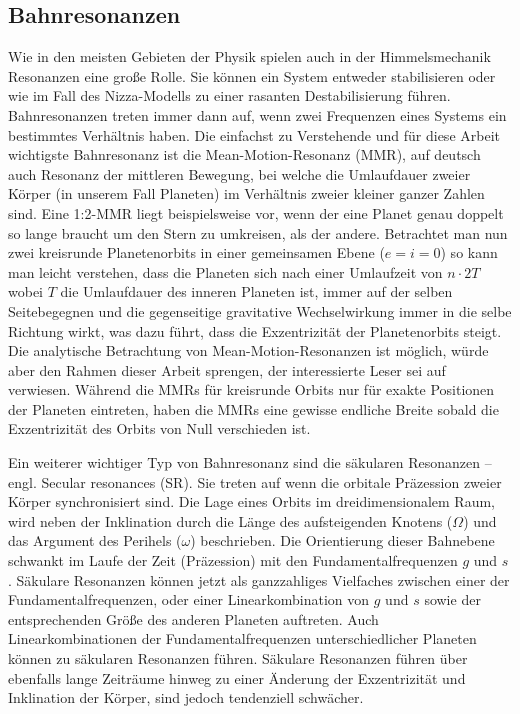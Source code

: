 \documentclass[12pt,a4paper,twoside]{article}
\begin{document}
\subsection{Bahnresonanzen}
Wie in den meisten Gebieten der Physik spielen auch in der Himmelsmechanik Resonanzen eine große Rolle. Sie können ein System entweder stabilisieren oder wie im Fall des Nizza-Modells zu einer rasanten Destabilisierung führen.
Bahnresonanzen treten immer dann auf, wenn zwei Frequenzen eines Systems ein bestimmtes Verhältnis haben.
Die einfachst zu Verstehende und für diese Arbeit wichtigste Bahnresonanz ist die Mean-Motion-Resonanz (MMR), auf deutsch auch Resonanz der mittleren Bewegung, bei welche die Umlaufdauer zweier Körper (in unserem Fall Planeten) im Verhältnis zweier kleiner ganzer Zahlen sind.
Eine 1:2-MMR liegt beispielsweise vor, wenn der eine Planet genau doppelt so lange braucht um den Stern zu umkreisen, als der andere. Betrachtet man nun zwei kreisrunde Planetenorbits in einer gemeinsamen Ebene ($e=i=0$) so kann man leicht verstehen, dass die Planeten sich nach einer Umlaufzeit von $n\cdot 2T$ wobei $T$ die Umlaufdauer des inneren Planeten ist, immer auf der \glqq selben Seite\grqq begegnen und die gegenseitige gravitative Wechselwirkung immer in die selbe Richtung wirkt, was dazu führt, dass die Exzentrizität der Planetenorbits steigt.
Die analytische Betrachtung von Mean-Motion-Resonanzen ist möglich, würde aber den Rahmen dieser Arbeit sprengen, der interessierte Leser sei auf \cite{Dvorak2005} verwiesen. %
Während die MMRs für kreisrunde Orbits nur für exakte Positionen der Planeten eintreten, haben die MMRs eine gewisse endliche Breite sobald die Exzentrizität des Orbits von Null verschieden ist.

Ein weiterer wichtiger Typ von Bahnresonanz sind die säkularen Resonanzen – engl. Secular resonances (SR). Sie treten auf wenn die orbitale Präzession zweier Körper synchronisiert sind. %
Die Lage eines Orbits im dreidimensionalem Raum, wird neben der Inklination durch die Länge des aufsteigenden Knotens ($\Omega$) und das Argument des Perihels ($\omega$) beschrieben. Die Orientierung dieser Bahnebene schwankt im Laufe der Zeit (Präzession) mit den Fundamentalfrequenzen $g$ und $s$. Säkulare Resonanzen können jetzt als ganzzahliges Vielfaches zwischen einer der Fundamentalfrequenzen, oder einer Linearkombination von $g$ und $s$ sowie der entsprechenden Größe des anderen Planeten auftreten. Auch Linearkombinationen der Fundamentalfrequenzen unterschiedlicher Planeten können zu säkularen Resonanzen führen.
Säkulare Resonanzen führen über ebenfalls lange Zeiträume hinweg zu einer Änderung der Exzentrizität und Inklination der Körper, sind jedoch tendenziell schwächer.
\end{document}
